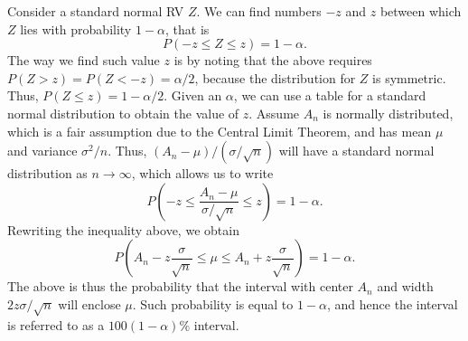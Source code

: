 \documentclass[a4paper,12pt]{article}
\begin{document}
Consider a standard normal RV $Z$. We can find numbers $-z$ and $z$ between which $Z$ lies with probability $1-\alpha$, that is
\begin{equation}
P(-z \le Z \le z) = 1 - \alpha.
\end{equation}
The way we find such value $z$ is by noting that the above requires $P(Z > z) = P(Z < -z) = \alpha /2$, because the distribution for $Z$ is symmetric. Thus, $P(Z \le z) = 1 - \alpha/2$. Given an $\alpha$, we can use a table for a standard normal distribution to obtain the value of $z$. Assume $A_n$ is normally distributed, which is a fair assumption due to the Central Limit Theorem, and has mean $\mu$ and variance $\sigma^2/n$. Thus, $(A_n - \mu)/(\sigma/\sqrt{n})$ will have a standard normal distribution as $n \to \infty$, which allows us to write
\begin{equation}
P(-z \le \frac{A_n - \mu}{\sigma/\sqrt{n}} \le z) = 1 - \alpha .
\end{equation}
Rewriting the inequality above, we obtain
\begin{equation}
P(A_n - z \frac{\sigma}{\sqrt{n}} \le \mu \le A_n + z \frac{\sigma}{\sqrt{n}} ) = 1 - \alpha .
\end{equation}
The above is thus the probability that the interval with center $A_n$ and width $2z\sigma/\sqrt{n}$ will enclose $\mu$. Such probability is equal to $1-\alpha$, and hence the interval is referred to as a $100 (1-\alpha) \%$ interval.
\end{document}
